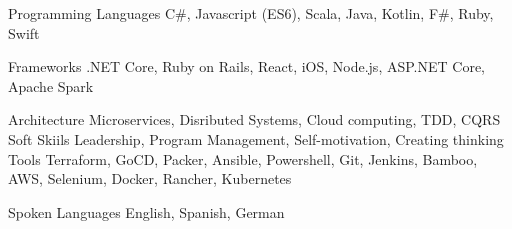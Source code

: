 

\begin{cvskills}

  \cvskill
    {Programming Languages} %
    {C\#, Javascript (ES6), Scala, Java, Kotlin, F\#, Ruby, Swift } %

  \cvskill
    {Frameworks} %
    {.NET Core, Ruby on Rails, React, iOS, Node.js, ASP.NET Core, Apache Spark} %

  \cvskill
    {Architecture} %
    {Microservices, Disributed Systems, Cloud computing, TDD, CQRS } %
  \cvskill
    {Soft Skiils} %
    {Leadership, Program Management, Self-motivation, Creating thinking} %
  \cvskill
    {Tools} %
    {Terraform, GoCD, Packer, Ansible, Powershell, Git, Jenkins, Bamboo, AWS, Selenium, Docker, Rancher, Kubernetes} %

  \cvskill
    {Spoken Languages} %
    { English, Spanish, German} %

\end{cvskills}

